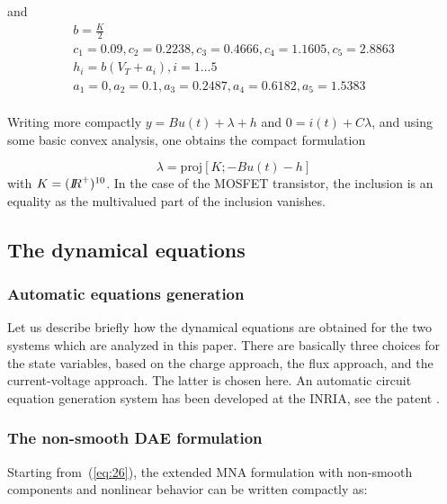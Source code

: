 \documentclass{article}
\begin{document}
and 
\begin{equation}
  \label{eq:70}
  \begin{array}{l}
  b = \frac{K}{2} \\
  c_1 = 0.09 , c_2=0.2238 , c_3=0.4666 , c_4=1.1605 , c_5=2.8863 \\
  h_i = b(V_T+a_i), i =1\ldots 5 \\
  a_1 = 0 , a_2=0.1, a_3=0.2487 , a_4=0.6182 , a_5=1.5383 \\
\end{array}
\end{equation}


Writing more compactly $y=Bu(t)+\lambda+h$ and $0=i(t)+C\lambda$, and using some basic convex analysis, one obtains the compact formulation

\begin{equation}
\lambda=\mbox{proj}[K; -Bu(t)-h]
\end{equation}
with $K=(\mbox{\rm $I\!\!R$}^{+})^{10}$. In the case of the MOSFET transistor, the inclusion is an equality as the multivalued part of the inclusion vanishes. 






\subsection{The dynamical equations}
\label{section22}


\subsubsection{Automatic equations generation}

Let us describe briefly how the dynamical equations are obtained for the two systems which are analyzed in this paper. There are basically three choices for the state variables, based on the charge approach, the flux approach, and the current-voltage approach. The latter is chosen here. An automatic circuit equation generation system has been developed at the INRIA, see the patent \cite{}. 




\subsubsection{The non-smooth DAE formulation}


Starting from~(\ref{eq:26}), the extended MNA formulation with non-smooth components and nonlinear behavior can  be written compactly as:
\end{document}
